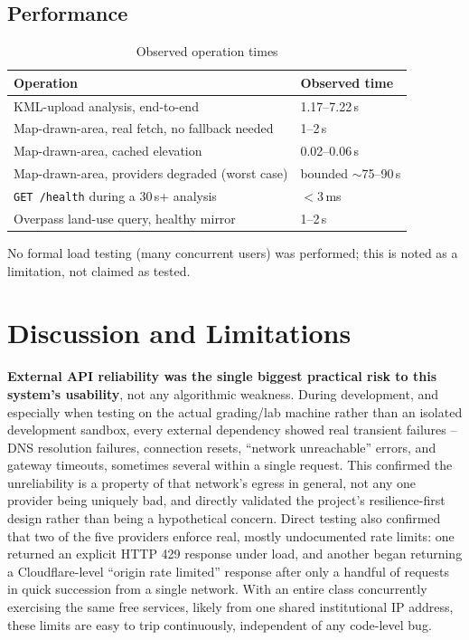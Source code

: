 \documentclass[manuscript,screen]{acmart}
\begin{document}
\subsection{Performance}

\begin{table}[h]
  \caption{Observed operation times}
  \label{tab:performance}
  \begin{tabular}{p{5.6cm}p{2.2cm}}
    \toprule
    Operation & Observed time \\
    \midrule
    KML-upload analysis, end-to-end & 1.17--7.22\,s \\
    Map-drawn-area, real fetch, no fallback needed & 1--2\,s \\
    Map-drawn-area, cached elevation & 0.02--0.06\,s \\
    Map-drawn-area, providers degraded (worst case) & bounded $\sim$75--90\,s \\
    \texttt{GET /health} during a 30\,s+ analysis & $<$3\,ms \\
    Overpass land-use query, healthy mirror & 1--2\,s \\
    \bottomrule
  \end{tabular}
\end{table}

No formal load testing (many concurrent users) was performed; this is
noted as a limitation, not claimed as tested.

\section{Discussion and Limitations}
\label{sec:discussion}

\textbf{External API reliability was the single biggest practical risk to
this system's usability}, not any algorithmic weakness. During
development, and especially when testing on the actual grading/lab
machine rather than an isolated development sandbox, every external
dependency showed real transient failures -- DNS resolution failures,
connection resets, ``network unreachable'' errors, and gateway timeouts,
sometimes several within a single request. This confirmed the
unreliability is a property of that network's egress in general, not any
one provider being uniquely bad, and directly validated the project's
resilience-first design rather than being a hypothetical concern. Direct
testing also confirmed that two of the five providers enforce real,
mostly undocumented rate limits: one returned an explicit HTTP 429
response under load, and another began returning a Cloudflare-level
``origin rate limited'' response after only a handful of requests in
quick succession from a single network. With an entire class concurrently
exercising the same free services, likely from one shared institutional
IP address, these limits are easy to trip continuously, independent of
any code-level bug.
\end{document}
